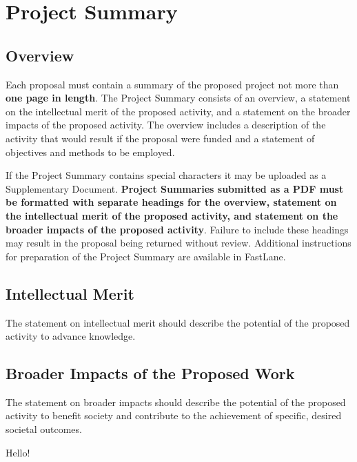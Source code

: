 \section{Project Summary}
\subsection{Overview} 
Each proposal must contain a summary of the proposed project not more than {\bf one page in length}. The Project
Summary consists of an overview, a statement on the intellectual merit of the proposed activity, and a statement
on the broader impacts of the proposed activity.
The overview includes a description of the activity that would result if the proposal were funded and a statement
of objectives and methods to be employed.  

If the Project Summary contains special characters it may be uploaded as a Supplementary Document.
{\bf Project Summaries submitted as a PDF must be formatted with separate headings for the overview, statement on the
intellectual merit of the proposed activity, and statement on the broader impacts of the proposed activity}. Failure
to include these headings may result in the proposal being returned without review.
Additional instructions for preparation of the Project Summary are available in FastLane.\\
\subsection{Intellectual Merit} 
The statement on intellectual merit should describe the potential of the proposed activity to advance knowledge.
\subsection{Broader Impacts of the Proposed Work} 
The statement on broader impacts should describe the potential of the proposed activity to benefit society and contribute to the achievement of specific, desired societal outcomes.

Hello!
